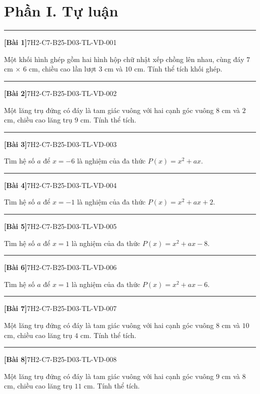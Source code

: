 \documentclass[12pt,a4paper]{article}
\newif\ifloigiai
\newenvironment{cauhoi}[2]{%
  \par\medskip\noindent\rule{\textwidth}{0.4pt}\par\nopagebreak
  \noindent\textbf{[#1]}\hfill{\scriptsize\ttfamily #2}\par\nopagebreak\smallskip}{\par}
\newcommand{\loigiai}[1]{\ifloigiai\par\smallskip\noindent\textit{Lời giải.} #1\par\fi}
\begin{document}
\section*{Phần I. Tự luận}
\begin{cauhoi}{Bài 1}{7H2-C7-B25-D03-TL-VD-001}
Một khối hình ghép gồm hai hình hộp chữ nhật xếp chồng lên nhau, cùng đáy $7$ cm $\times$ $6$ cm, chiều cao lần lượt $3$ cm và $10$ cm. Tính thể tích khối ghép.
\loigiai{Thể tích hai khối là $7\cdot 6\cdot 3=126$ và $7\cdot 6\cdot 10=420$ ($\text{cm}^3$). Thể tích khối ghép là $126+420=546$ ($\text{cm}^3$).}
\end{cauhoi}
\begin{cauhoi}{Bài 2}{7H2-C7-B25-D03-TL-VD-002}
Một lăng trụ đứng có đáy là tam giác vuông với hai cạnh góc vuông $8$ cm và $2$ cm, chiều cao lăng trụ $9$ cm. Tính thể tích.
\loigiai{Diện tích đáy là $\dfrac{8\cdot 2}{2}=8$ ($\text{cm}^2$). Thể tích là $8\cdot 9=72$ ($\text{cm}^3$).}
\end{cauhoi}
\begin{cauhoi}{Bài 3}{7H2-C7-B25-D03-TL-VD-003}
Tìm hệ số $a$ để $x=-6$ là nghiệm của đa thức $P(x)=x^{2}+ax$.
\loigiai{$x=-6$ là nghiệm nên $P(-6)=0$: $36-6\cdot a=0$ nên $-6a=-36$, suy ra $a=6$.}
\end{cauhoi}
\begin{cauhoi}{Bài 4}{7H2-C7-B25-D03-TL-VD-004}
Tìm hệ số $a$ để $x=-1$ là nghiệm của đa thức $P(x)=x^{2}+ax+2$.
\loigiai{$x=-1$ là nghiệm nên $P(-1)=0$: $1-1\cdot a+2=0$ nên $-a=-3$, suy ra $a=3$.}
\end{cauhoi}
\begin{cauhoi}{Bài 5}{7H2-C7-B25-D03-TL-VD-005}
Tìm hệ số $a$ để $x=1$ là nghiệm của đa thức $P(x)=x^{2}+ax-8$.
\loigiai{$x=1$ là nghiệm nên $P(1)=0$: $1+1\cdot a-8=0$ nên $a=7$, suy ra $a=7$.}
\end{cauhoi}
\begin{cauhoi}{Bài 6}{7H2-C7-B25-D03-TL-VD-006}
Tìm hệ số $a$ để $x=1$ là nghiệm của đa thức $P(x)=x^{2}+ax-6$.
\loigiai{$x=1$ là nghiệm nên $P(1)=0$: $1+1\cdot a-6=0$ nên $a=5$, suy ra $a=5$.}
\end{cauhoi}
\begin{cauhoi}{Bài 7}{7H2-C7-B25-D03-TL-VD-007}
Một lăng trụ đứng có đáy là tam giác vuông với hai cạnh góc vuông $8$ cm và $10$ cm, chiều cao lăng trụ $4$ cm. Tính thể tích.
\loigiai{Diện tích đáy là $\dfrac{8\cdot 10}{2}=40$ ($\text{cm}^2$). Thể tích là $40\cdot 4=160$ ($\text{cm}^3$).}
\end{cauhoi}
\begin{cauhoi}{Bài 8}{7H2-C7-B25-D03-TL-VD-008}
Một lăng trụ đứng có đáy là tam giác vuông với hai cạnh góc vuông $9$ cm và $8$ cm, chiều cao lăng trụ $11$ cm. Tính thể tích.
\loigiai{Diện tích đáy là $\dfrac{9\cdot 8}{2}=36$ ($\text{cm}^2$). Thể tích là $36\cdot 11=396$ ($\text{cm}^3$).}
\end{cauhoi}
\end{document}
